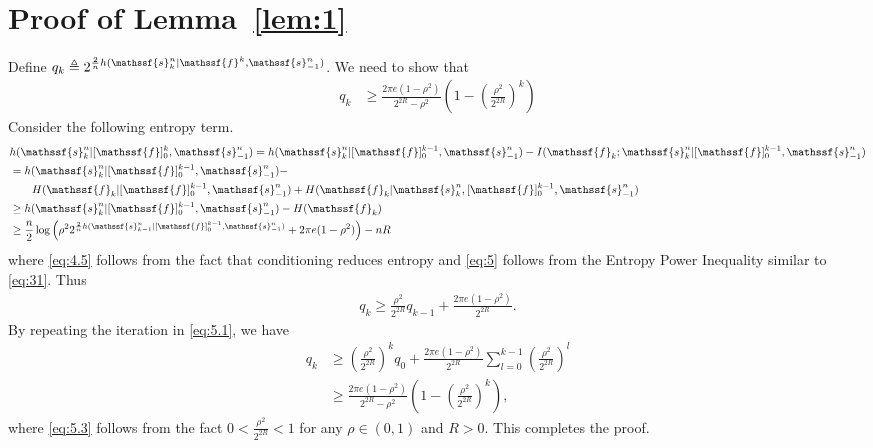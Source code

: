 \documentclass[journal, twocolumn, 10pt]{IEEEtran}
\newcommand{\rvf}{{\mathssf{f}}}    %
\newcommand{\rvs}{{\mathssf{s}}}    %
\begin{document}
{\section{Proof of Lemma~\ref{lem:1}}
\label{ApA}
Define $q_{k} \triangleq 2^{\frac{2}{n}h(\rvs^n_{k}|\rvf^{k}, \rvs^n_{-1})}$. We need to show that 
\begin{align}
q_k &\ge \frac{2\pi e (1-\rho^2)}{2^{2R}-\rho^2}\left(1-\left(\frac{\rho^2}{2^{2R}}\right)^k\right) 
\end{align}
Consider the following entropy term.
\begin{align}
&h(\rvs^n_{k}|[\rvf]_{0}^{k}, \rvs^n_{-1}) = h(\rvs^n_{k}|[\rvf]_{0}^{k-1}, \rvs^n_{-1})- I(\rvf_{k};\rvs_{k}^n|[\rvf]_{0}^{k-1}, \rvs^n_{-1})\notag\\
&= h(\rvs^n_{k}|[\rvf]_{0}^{k-1}, \rvs^n_{-1})- \notag\\ &\qquad H(\rvf_{k}|[\rvf]_{0}^{k-1}, \rvs^n_{-1}) +  H(\rvf_{k}|\rvs^n_{k}, [\rvf]_{0}^{k-1}, \rvs^n_{-1})\notag\\
& \ge h(\rvs^n_{k}|[\rvf]_{0}^{k-1}, \rvs^n_{-1})- H(\rvf_{k})\label{eq:4.5}\\
& \ge \frac{n}{2}\log\left( \rho^{2}2^{\frac{2}{n}h(\rvs^n_{k-1}|[\rvf]_{0}^{k-1}, \rvs^n_{-1})}+ 2\pi e (1-\rho^{2})\right) - nR \label{eq:5}
\end{align}
where \eqref{eq:4.5} follows from the fact that conditioning reduces entropy and \eqref{eq:5} follows from the Entropy Power Inequality similar to \eqref{eq:31}. Thus
\begin{align}
q_k \ge \frac{\rho^2}{2^{2R}} q_{k-1} + \frac{2\pi e (1-\rho^2)}{2^{2R}}. \label{eq:5.1}
\end{align} 
By repeating the iteration in \eqref{eq:5.1}, we have
\begin{align}
q_k &\ge (\frac{\rho^{2}}{2^{2R}})^k q_{0} + \frac{2\pi e (1-\rho^2)}{2^{2R}} \sum_{l=0}^{k-1} (\frac{\rho^{2}}{2^{2R}})^{l}\label{eq:5.2} \\
&\ge \frac{2\pi e (1-\rho^2)}{2^{2R}-\rho^2}\left(1-\left(\frac{\rho^2}{2^{2R}}\right)^k\right) \label{eq:5.3}, 
\end{align} where \eqref{eq:5.3} follows from the fact $0 <\frac{\rho^2}{2^{2R}} < 1$ for any $\rho \in (0,1)$ and $R>0$. This completes the proof.

}
\end{document}

